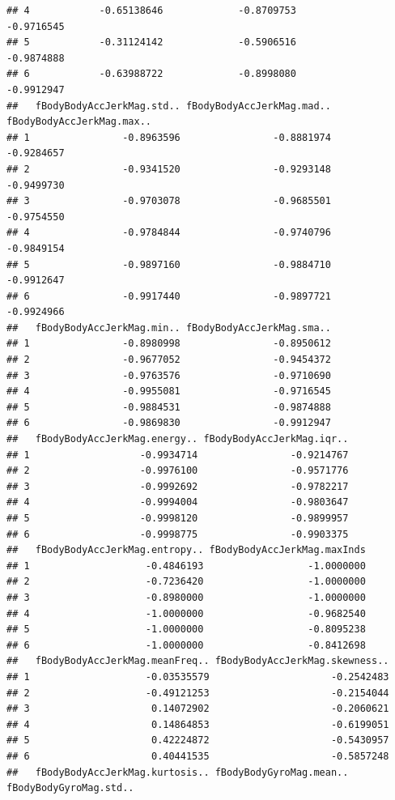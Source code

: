 \documentclass[
]{article}
\begin{document}
\begin{verbatim}
## 4            -0.65138646             -0.8709753                 -0.9716545
## 5            -0.31124142             -0.5906516                 -0.9874888
## 6            -0.63988722             -0.8998080                 -0.9912947
##   fBodyBodyAccJerkMag.std.. fBodyBodyAccJerkMag.mad.. fBodyBodyAccJerkMag.max..
## 1                -0.8963596                -0.8881974                -0.9284657
## 2                -0.9341520                -0.9293148                -0.9499730
## 3                -0.9703078                -0.9685501                -0.9754550
## 4                -0.9784844                -0.9740796                -0.9849154
## 5                -0.9897160                -0.9884710                -0.9912647
## 6                -0.9917440                -0.9897721                -0.9924966
##   fBodyBodyAccJerkMag.min.. fBodyBodyAccJerkMag.sma..
## 1                -0.8980998                -0.8950612
## 2                -0.9677052                -0.9454372
## 3                -0.9763576                -0.9710690
## 4                -0.9955081                -0.9716545
## 5                -0.9884531                -0.9874888
## 6                -0.9869830                -0.9912947
##   fBodyBodyAccJerkMag.energy.. fBodyBodyAccJerkMag.iqr..
## 1                   -0.9934714                -0.9214767
## 2                   -0.9976100                -0.9571776
## 3                   -0.9992692                -0.9782217
## 4                   -0.9994004                -0.9803647
## 5                   -0.9998120                -0.9899957
## 6                   -0.9998775                -0.9903375
##   fBodyBodyAccJerkMag.entropy.. fBodyBodyAccJerkMag.maxInds
## 1                    -0.4846193                  -1.0000000
## 2                    -0.7236420                  -1.0000000
## 3                    -0.8980000                  -1.0000000
## 4                    -1.0000000                  -0.9682540
## 5                    -1.0000000                  -0.8095238
## 6                    -1.0000000                  -0.8412698
##   fBodyBodyAccJerkMag.meanFreq.. fBodyBodyAccJerkMag.skewness..
## 1                    -0.03535579                     -0.2542483
## 2                    -0.49121253                     -0.2154044
## 3                     0.14072902                     -0.2060621
## 4                     0.14864853                     -0.6199051
## 5                     0.42224872                     -0.5430957
## 6                     0.40441535                     -0.5857248
##   fBodyBodyAccJerkMag.kurtosis.. fBodyBodyGyroMag.mean.. fBodyBodyGyroMag.std..

\end{verbatim}
\end{document}
